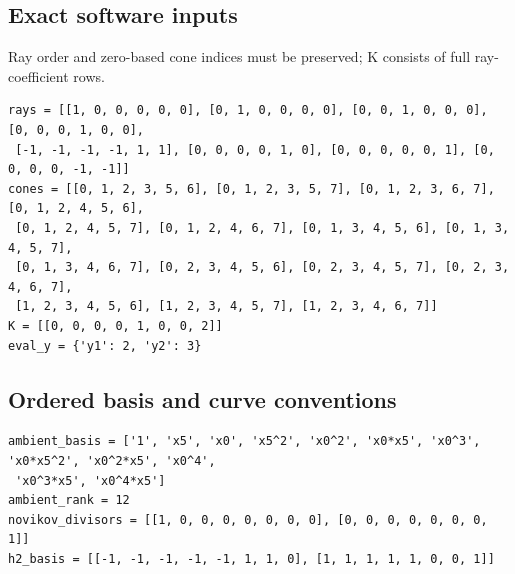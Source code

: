 \documentclass[10pt,a4paper]{article}
\begin{document}
\subsection*{Exact software inputs}
Ray order and zero-based cone indices must be preserved; K consists of full ray-coefficient rows.
\begin{lstlisting}
rays = [[1, 0, 0, 0, 0, 0], [0, 1, 0, 0, 0, 0], [0, 0, 1, 0, 0, 0], [0, 0, 0, 1, 0, 0],
 [-1, -1, -1, -1, 1, 1], [0, 0, 0, 0, 1, 0], [0, 0, 0, 0, 0, 1], [0, 0, 0, 0, -1, -1]]
cones = [[0, 1, 2, 3, 5, 6], [0, 1, 2, 3, 5, 7], [0, 1, 2, 3, 6, 7], [0, 1, 2, 4, 5, 6],
 [0, 1, 2, 4, 5, 7], [0, 1, 2, 4, 6, 7], [0, 1, 3, 4, 5, 6], [0, 1, 3, 4, 5, 7],
 [0, 1, 3, 4, 6, 7], [0, 2, 3, 4, 5, 6], [0, 2, 3, 4, 5, 7], [0, 2, 3, 4, 6, 7],
 [1, 2, 3, 4, 5, 6], [1, 2, 3, 4, 5, 7], [1, 2, 3, 4, 6, 7]]
K = [[0, 0, 0, 0, 1, 0, 0, 2]]
eval_y = {'y1': 2, 'y2': 3}
\end{lstlisting}
\subsection*{Ordered basis and curve conventions}
\begin{lstlisting}
ambient_basis = ['1', 'x5', 'x0', 'x5^2', 'x0^2', 'x0*x5', 'x0^3', 'x0*x5^2', 'x0^2*x5', 'x0^4',
 'x0^3*x5', 'x0^4*x5']
ambient_rank = 12
novikov_divisors = [[1, 0, 0, 0, 0, 0, 0, 0], [0, 0, 0, 0, 0, 0, 0, 1]]
h2_basis = [[-1, -1, -1, -1, -1, 1, 1, 0], [1, 1, 1, 1, 1, 0, 0, 1]]
\end{lstlisting}
\end{document}

